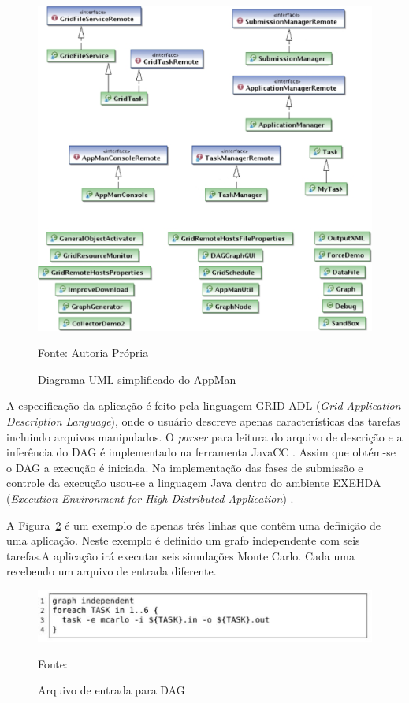 \begin{figure}[htbp]
\begin{center}
\includegraphics[scale=0.5]{./img/UML-2.eps}
\caption{Diagrama UML simplificado do AppMan}
\label{fig:AppMan-UML}
Fonte: Autoria Própria
\end{center}
\end{figure}

\pagebreak

A especificação da aplicação é feito pela linguagem GRID-ADL (\emph{Grid Application Description Language}), onde o usuário descreve apenas características das tarefas incluindo arquivos manipulados. O \emph{parser} para leitura do arquivo de descrição e a inferência do DAG é implementado na ferramenta JavaCC \cite{javacc}. Assim que obtém-se o DAG a execução é iniciada. Na implementação das fases de submissão e controle da execução usou-se a linguagem Java dentro do ambiente EXEHDA (\emph{Execution Environment for High Distributed Application}) \cite{exehda}.

A Figura~\ref{fig:Arquivo_DAG} é um exemplo de apenas três linhas que contêm uma definição de uma aplicação. Neste exemplo é definido um grafo independente com seis tarefas.A aplicação irá executar seis simulações Monte Carlo. Cada uma recebendo um arquivo de entrada diferente.

\begin{figure}[h]
\begin{center}
\includegraphics[scale=0.7]{./img/grid-adl.eps}
\caption{Arquivo de entrada para DAG}
\label{fig:Arquivo_DAG}
Fonte: \cite{Mangan2006}
\end{center}
\end{figure}


